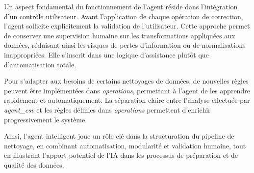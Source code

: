 \documentclass[a4paper, 12pt, twoside]{article}
\begin{document}
Un aspect fondamental du fonctionnement de l’agent réside dans l’intégration d’un contrôle utilisateur. Avant l’application de chaque opération de correction, l’agent sollicite explicitement la validation de l’utilisateur. Cette approche permet de conserver une supervision humaine sur les transformations appliquées aux données, réduisant ainsi les risques de pertes d’information ou de normalisations inappropriées. Elle s’inscrit dans une logique d’assistance plutôt que d’automatisation totale.

Pour s'adapter aux besoins de certains nettoyages de données, de nouvelles règles peuvent être implémentées dans \textit{operations}, permettant à l'agent de les apprendre rapidement et automatiquement. La séparation claire entre l’analyse effectuée par \textit{agent\_csv} et les règles définies dans \textit{operations} permettent d’enrichir progressivement le système.

Ainsi, l’agent intelligent joue un rôle clé dans la structuration du pipeline de nettoyage, en combinant automatisation, modularité et validation humaine, tout en illustrant l’apport potentiel de l’IA dans les processus de préparation et de qualité des données.
\end{document}
